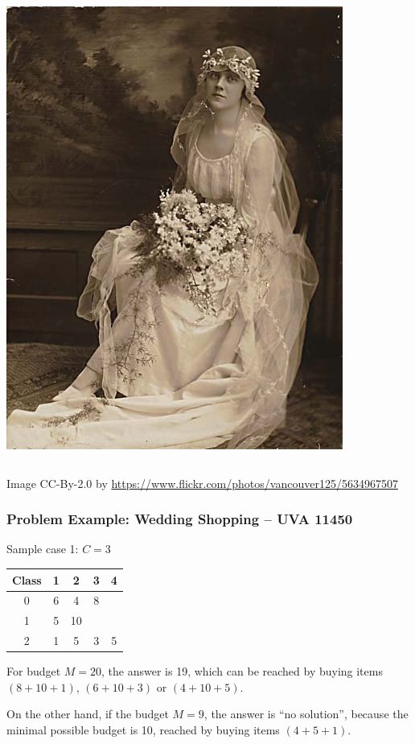 \documentclass{beamer}
\begin{document}
\begin{frame}
\begin{columns}
      \includegraphics[width=.8\textwidth]{../img/weddingdress}\\
    \end{columns}
    \vfill
    {\tiny
    \hfill Image CC-By-2.0 by \url{https://www.flickr.com/photos/vancouver125/5634967507}}

\end{frame}

\begin{frame}
  \frametitle{Problem Example: Wedding Shopping -- UVA 11450}
  \begin{block}{Sample case 1: $C=3$}
  \begin{tabular}{|c|cccc|}
    Class & 1 & 2 & 3 & 4\\
    \hline
    0 & 6 & 4 & 8 & \\
    1 & 5 & 10 & & \\
    2 & 1 & 5 & 3 & 5\\
  \end{tabular}
  \end{block}

  \medskip

  For budget $M=20$, the answer is \alert{19}, which can be reached by buying items
  $(8+10+1)$, $(6+10+3)$ or $(4+10+5)$.

  \bigskip

  On the other hand, if the budget $M=9$, the answer is ``no
  solution'', because the minimal possible budget is \alert{10},
  reached by buying items $(4+5+1)$.
\end{frame}
\end{document}
